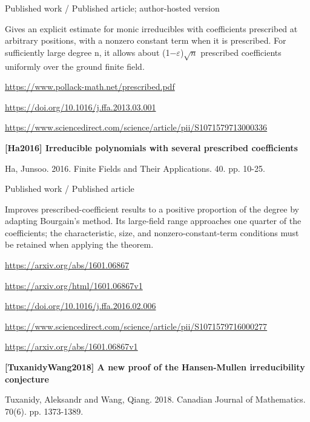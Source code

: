 \documentclass[11pt,a4paper,oneside,openany]{book}
\begin{document}
{\small\sffamily\color{atlasgold}Published work / Published article; author-hosted version}\par
\color{black} Gives an explicit estimate for monic irreducibles with coefficients prescribed at arbitrary positions, with a nonzero constant term when it is prescribed. For sufficiently large degree n, it allows about (1\ensuremath{-}\ensuremath{\varepsilon})\(\sqrt{n}\) prescribed coefficients uniformly over the ground finite field.\par
{\footnotesize\url{https://www.pollack-math.net/prescribed.pdf}}\par
{\footnotesize\url{https://doi.org/10.1016/j.ffa.2013.03.001}}\par
{\footnotesize\url{https://www.sciencedirect.com/science/article/pii/S1071579713000336}}\par
\vspace{9pt}
\hypertarget{ref:Ha2016}{}
{\sffamily\bfseries\color{atlasgreen}[Ha2016] Irreducible polynomials with several prescribed coefficients}\par
\color{black} Ha, Junsoo. 2016. Finite Fields and Their Applications. 40. pp. 10-25.\par
{\small\sffamily\color{atlasgold}Published work / Published article}\par
\color{black} Improves prescribed-coefficient results to a positive proportion of the degree by adapting Bourgain's method. Its large-field range approaches one quarter of the coefficients; the characteristic, size, and nonzero-constant-term conditions must be retained when applying the theorem.\par
{\footnotesize\url{https://arxiv.org/abs/1601.06867}}\par
{\footnotesize\url{https://arxiv.org/html/1601.06867v1}}\par
{\footnotesize\url{https://doi.org/10.1016/j.ffa.2016.02.006}}\par
{\footnotesize\url{https://www.sciencedirect.com/science/article/pii/S1071579716000277}}\par
{\footnotesize\url{https://arxiv.org/abs/1601.06867v1}}\par
\vspace{9pt}
\hypertarget{ref:TuxanidyWang2018}{}
{\sffamily\bfseries\color{atlasgreen}[TuxanidyWang2018] A new proof of the Hansen-Mullen irreducibility conjecture}\par
\color{black} Tuxanidy, Aleksandr and Wang, Qiang. 2018. Canadian Journal of Mathematics. 70(6). pp. 1373-1389.\par
\end{document}
